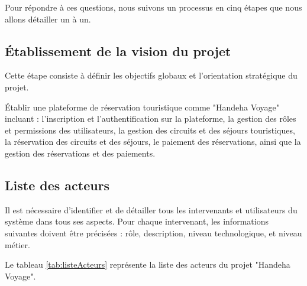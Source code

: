 \documentclass[12pt]{report}
\begin{document}
				Pour répondre à ces questions, nous suivons un processus en cinq étapes que nous allons détailler un à un.

				\subsection{Établissement de la vision du projet}

				\hspace{15pt} Cette étape consiste à définir les objectifs globaux et l'orientation stratégique du projet.

				Établir une plateforme de réservation touristique comme "Handeha Voyage" incluant : l'inscription et l'authentification sur la plateforme, la gestion des rôles et permissions des utilisateurs, la gestion des circuits et des séjours touristiques, la réservation des circuits et des séjours, le paiement des réservations, ainsi que la gestion des réservations et des paiements.

				\subsection{Liste des acteurs}

				\hspace{15pt} Il est nécessaire d'identifier et de détailler tous les intervenants et utilisateurs du système dans tous ses aspects. Pour chaque intervenant, les informations suivantes doivent être précisées : rôle, description, niveau technologique, et niveau métier.

				Le tableau \ref{tab:listeActeurs} représente la liste des acteurs du projet "Handeha Voyage".
\end{document}
